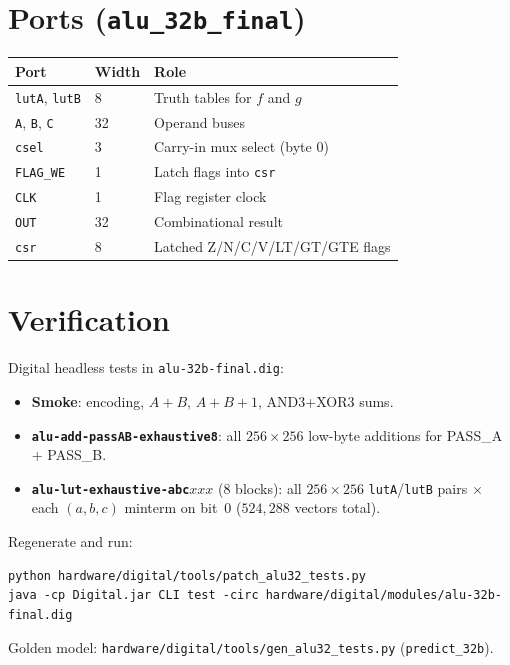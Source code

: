 \documentclass[10pt,a4paper]{article}
\begin{document}
\section{Ports (\texttt{alu\_32b\_final})}

\begin{center}
\scriptsize
\begin{tabular}{@{}lll@{}}
\toprule
\textbf{Port} & \textbf{Width} & \textbf{Role} \\
\midrule
\texttt{lutA}, \texttt{lutB} & 8 & Truth tables for $f$ and $g$ \\
\texttt{A}, \texttt{B}, \texttt{C} & 32 & Operand buses \\
\texttt{csel} & 3 & Carry-in mux select (byte 0) \\
\texttt{FLAG\_WE} & 1 & Latch flags into \texttt{csr} \\
\texttt{CLK} & 1 & Flag register clock \\
\texttt{OUT} & 32 & Combinational result \\
\texttt{csr} & 8 & Latched Z/N/C/V/LT/GT/GTE flags \\
\bottomrule
\end{tabular}
\end{center}

\section{Verification}

Digital headless tests in \texttt{alu-32b-final.dig}:

\begin{itemize}
  \item \textbf{Smoke}: encoding, $A+B$, $A+B+1$, AND3+XOR3 sums.
  \item \textbf{\texttt{alu-add-passAB-exhaustive8}}: all $256 \times 256$ low-byte additions for PASS\_A + PASS\_B.
  \item \textbf{\texttt{alu-lut-exhaustive-abc}$xxx$} (8 blocks): all $256 \times 256$ \texttt{lutA}/\texttt{lutB} pairs $\times$ each $(a,b,c)$ minterm on bit~0 ($524{,}288$ vectors total).
\end{itemize}

Regenerate and run:
\begin{lstlisting}
python hardware/digital/tools/patch_alu32_tests.py
java -cp Digital.jar CLI test -circ hardware/digital/modules/alu-32b-final.dig
\end{lstlisting}

Golden model: \texttt{hardware/digital/tools/gen\_alu32\_tests.py} (\texttt{predict\_32b}).
\end{document}

